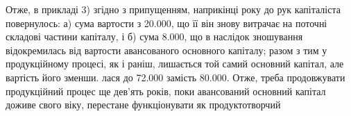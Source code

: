 Отже, в прикладі 3) згідно з припущенням, наприкінці року до рук
капіталіста повернулось: а) сума вартости з 20.000, що її він
знову витрачає на поточні складові частини капіталу, і б) сума 8.000, що в наслідок зношування відокремилась від вартости авансованого
основного капіталу; разом з тим у продукційному процесі, як і
раніш, лишається той самий основний капітал, але вартість його зменши.
лася до 72.000 замість 80.000. Отже, треба продовжувати
продукційний процес ще дев’ять років, поки авансований основний
капітал доживе свого віку, перестане функціонувати як продуктотворчий
\parbreak{}  %
